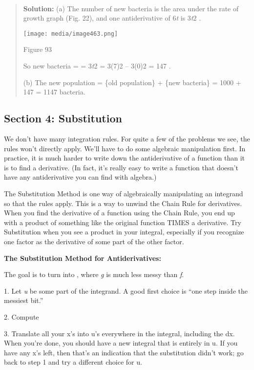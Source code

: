 \textbf{\\
}

\begin{quote}
\textbf{Solution:} (a) The number of new bacteria is the area under the
rate of growth graph (Fig. 22), and one antiderivative of 6\emph{t} is
3\emph{t}2 .

\texttt{[image: media/image463.png]}

Figure 93

So new bacteria = = 3\emph{t}2 \textbar{}= 3(7)2 -- 3(0)2 = 147 .

(b) The new population = \{old population\} + \{new bacteria\} = 1000 +
147 = 1147 bacteria.
\end{quote}

\hypertarget{section-4-substitution}{\subsection{Section 4:
Substitution}\label{section-4-substitution}}

We don't have many integration rules. For quite a few of the problems we
see, the rules won't directly apply. We'll have to do some algebraic
manipulation first. In practice, it is much harder to write down the
antiderivative of a function than it is to find a derivative. (In fact,
it's really easy to write a function that doesn't have any
antiderivative you can find with algebra.)

The Substitution Method is one way of algebraically manipulating an
integrand so that the rules apply. This is a way to unwind the Chain
Rule for derivatives. When you find the derivative of a function using
the Chain Rule, you end up with a product of something like the original
function TIMES a derivative. Try Substitution when you see a product in
your integral, especially if you recognize one factor as the derivative
of some part of the other factor.

\textbf{The Substitution Method for Antiderivatives:}

The goal is to turn into , where \emph{g} is much less messy than
\emph{f}.

1. Let \emph{u} be some part of the integrand. A good first choice is
``one step inside the messiest bit.''

2. Compute

3. Translate all your x's into u's everywhere in the integral, including
the dx. When you're done, you should have a new integral that is
entirely in u. If you have any x's left, then that's an indication that
the substitution didn't work; go back to step 1 and try a different
choice for u.

